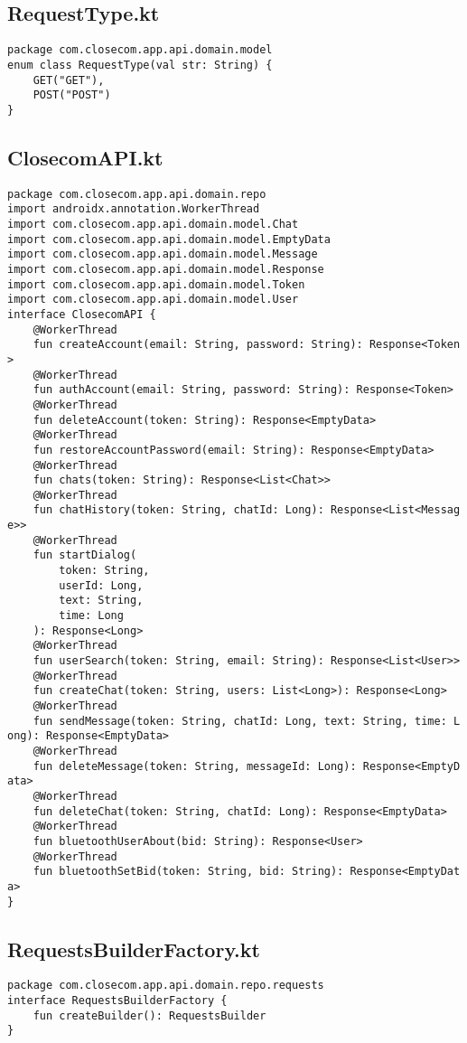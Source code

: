 \documentclass[listing]{espd}
\begin{document}
\subsection{RequestType.kt}
\begin{verbatim}
package com.closecom.app.api.domain.model
enum class RequestType(val str: String) {
    GET("GET"),
    POST("POST")
}
\end{verbatim}

\subsection{ClosecomAPI.kt}
\begin{verbatim}
package com.closecom.app.api.domain.repo
import androidx.annotation.WorkerThread
import com.closecom.app.api.domain.model.Chat
import com.closecom.app.api.domain.model.EmptyData
import com.closecom.app.api.domain.model.Message
import com.closecom.app.api.domain.model.Response
import com.closecom.app.api.domain.model.Token
import com.closecom.app.api.domain.model.User
interface ClosecomAPI {
    @WorkerThread
    fun createAccount(email: String, password: String): Response<Token
>
    @WorkerThread
    fun authAccount(email: String, password: String): Response<Token>
    @WorkerThread
    fun deleteAccount(token: String): Response<EmptyData>
    @WorkerThread
    fun restoreAccountPassword(email: String): Response<EmptyData>
    @WorkerThread
    fun chats(token: String): Response<List<Chat>>
    @WorkerThread
    fun chatHistory(token: String, chatId: Long): Response<List<Messag
e>>
    @WorkerThread
    fun startDialog(
        token: String,
        userId: Long,
        text: String,
        time: Long
    ): Response<Long>
    @WorkerThread
    fun userSearch(token: String, email: String): Response<List<User>>
    @WorkerThread
    fun createChat(token: String, users: List<Long>): Response<Long>
    @WorkerThread
    fun sendMessage(token: String, chatId: Long, text: String, time: L
ong): Response<EmptyData>
    @WorkerThread
    fun deleteMessage(token: String, messageId: Long): Response<EmptyD
ata>
    @WorkerThread
    fun deleteChat(token: String, chatId: Long): Response<EmptyData>
    @WorkerThread
    fun bluetoothUserAbout(bid: String): Response<User>
    @WorkerThread
    fun bluetoothSetBid(token: String, bid: String): Response<EmptyDat
a>
}
\end{verbatim}

\subsection{RequestsBuilderFactory.kt}
\begin{verbatim}
package com.closecom.app.api.domain.repo.requests
interface RequestsBuilderFactory {
    fun createBuilder(): RequestsBuilder
}
\end{verbatim}
\end{document}
